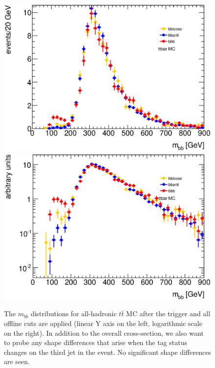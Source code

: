 \begin{figure}[hbt]
\includegraphics[width=0.45\linewidth]{BackgroundEstimation/images/mbb_compare_bbb_bbloose_bbanti_ttbar.eps}
\includegraphics[width=0.45\linewidth]{BackgroundEstimation/images/mbb_compare_bbb_bbloose_bbanti_ttbar_logy.eps}
\caption{The $m_{bb}$ distributions for all-hadronic $t\bar{t}$ MC after the trigger and all offline cuts are applied (linear Y axis on the left, logarithmic scale on the right).  In addition to the overall cross-section, we also want to probe any shape differences that arise when the tag status changes on the third jet in the event.  No significant shape differences are seen.}
\label{fig:ttbar_mbb}
\end{figure}

















